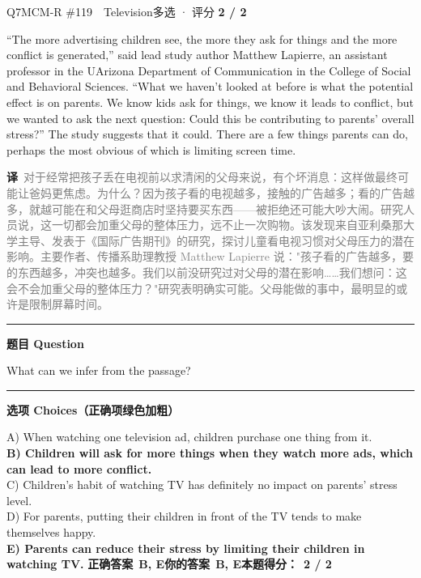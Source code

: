 \documentclass[11pt]{article}
\newcommand{\ptesub}[1]{%
  \par\needspace{2\baselineskip}\smallskip
  {\color{cAccent}\rule[-0.2ex]{3pt}{1.05em}}\hspace{6pt}%
  {\bfseries\color{cHead}#1}\par\nopagebreak\smallskip}
\newcommand{\zh}[1]{{\footnotesize\textcolor{cNote}{\textbf{译}}\ \textcolor{gray}{#1}}}
\begin{document}
\begin{qblock}{Q7\quad MCM-R \#119\ \ Television}{多选 · 评分 \textcolor{cAccent}{\bfseries 2 / 2}}
\begin{promptbox}
``The more advertising children see, the more they ask for things and the more conflict is generated,'' said lead study author Matthew Lapierre, an assistant professor in the UArizona Department of Communication in the College of Social and Behavioral Sciences. ``What we haven't looked at before is what the potential effect is on parents. We know kids ask for things, we know it leads to conflict, but we wanted to ask the next question: Could this be contributing to parents' overall stress?'' The study suggests that it could. There are a few things parents can do, perhaps the most obvious of which is limiting screen time.
\end{promptbox}
\zh{对于经常把孩子丢在电视前以求清闲的父母来说，有个坏消息：这样做最终可能让爸妈更焦虑。为什么？因为孩子看的电视越多，接触的广告越多；看的广告越多，就越可能在和父母逛商店时坚持要买东西——被拒绝还可能大吵大闹。研究人员说，这一切都会加重父母的整体压力，远不止一次购物。该发现来自亚利桑那大学主导、发表于《国际广告期刊》的研究，探讨儿童看电视习惯对父母压力的潜在影响。主要作者、传播系助理教授 Matthew Lapierre 说："孩子看的广告越多，要的东西越多，冲突也越多。我们以前没研究过对父母的潜在影响……我们想问：这会不会加重父母的整体压力？"研究表明确实可能。父母能做的事中，最明显的或许是限制屏幕时间。}
\ptesub{题目 Question}
\begin{notebox}What can we infer from the passage?\end{notebox}
\ptesub{选项 Choices（正确项绿色加粗）}
{\small
A) When watching one television ad, children purchase one thing from it.\\
{\color{cFix}\textbf{B) Children will ask for more things when they watch more ads, which can lead to more conflict.}}\\
C) Children's habit of watching TV has definitely no impact on parents' stress level.\\
D) For parents, putting their children in front of the TV tends to make themselves happy.\\
{\color{cFix}\textbf{E) Parents can reduce their stress by limiting their children in watching TV.}}}
\smallskip
\textbf{正确答案}\ \textcolor{cFix}{\bfseries B, E}\qquad\textbf{你的答案}\ \textcolor{cFix}{\bfseries B, E}\qquad\textbf{本题得分：}\ {\color{cAccent}\bfseries 2 / 2}
\end{qblock}
\end{document}
